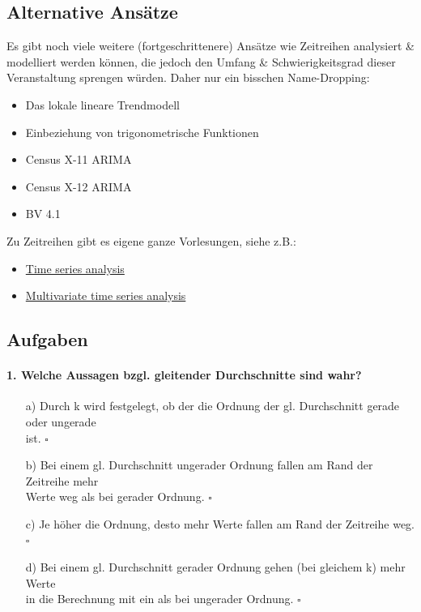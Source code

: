 \documentclass[a4paper]{article}
\begin{document}
\subsection{Alternative Ansätze}
Es gibt noch viele weitere (fortgeschrittenere) Ansätze wie Zeitreihen analysiert \& modelliert werden können, die jedoch den Umfang \& Schwierigkeitsgrad dieser Veranstaltung sprengen würden. Daher nur ein bisschen Name-Dropping:
\begin{itemize}
    \item Das lokale lineare Trendmodell
    \item Einbeziehung von trigonometrische Funktionen
    \item Census X-11 ARIMA
    \item Census X-12 ARIMA
    \item BV 4.1
\end{itemize}

Zu Zeitreihen gibt es eigene ganze Vorlesungen, siehe z.B.:

\begin{itemize}
    \item \href{https://www.finmetrics.statistik.uni-muenchen.de/studium_lehre/sommersemester-2020/tsa_19/index.html}{Time series analysis}
    \item \href{https://www.finmetrics.statistik.uni-muenchen.de/studium_lehre/sommersemester-2020/mtsa_2020/index.html}{Multivariate time series analysis}
\end{itemize}

\clearpage

\subsection{Aufgaben}

\paragraph{1. Welche Aussagen bzgl. gleitender Durchschnitte sind wahr?}

\begin{itemize}
    \item[a)] Durch k wird festgelegt, ob der die Ordnung der gl. Durchschnitt gerade oder ungerade\\ist. \hfill $\square$
    \item[b)] Bei einem gl. Durchschnitt ungerader Ordnung fallen am Rand der Zeitreihe mehr\\Werte weg als bei gerader Ordnung. \hfill $\square$
    \item[c)] Je höher die Ordnung, desto mehr Werte fallen am Rand der Zeitreihe weg. \hfill $\square$
    \item[d)] Bei einem gl. Durchschnitt gerader Ordnung gehen (bei gleichem k) mehr Werte\\in die Berechnung mit ein als bei ungerader Ordnung. \hfill $\square$
\end{itemize}
\end{document}
